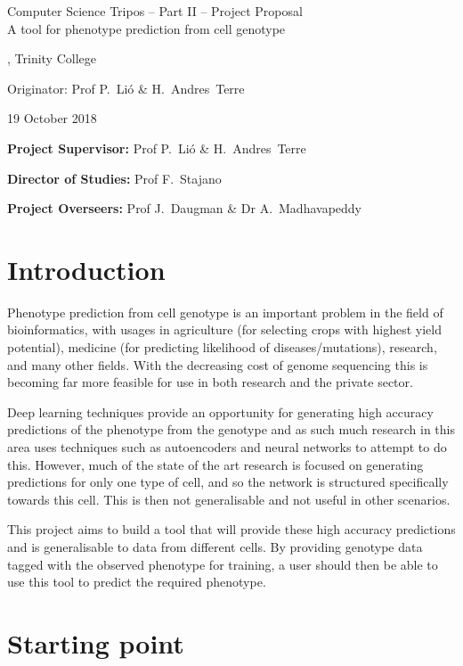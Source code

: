 \documentclass[12pt,a4paper,twoside,openany]{article}
\begin{document}
\begin{center}
\Large
Computer Science Tripos -- Part II -- Project Proposal\\[4mm]
\LARGE
A tool for phenotype prediction from cell genotype

\large
, Trinity College

Originator: Prof P.~Li\'o \& H.~Andres~Terre

19 October 2018
\end{center}

\vspace{5mm}

\textbf{Project Supervisor:} Prof P.~Li\'o \& H.~Andres~Terre

\textbf{Director of Studies:} Prof F.~Stajano

\textbf{Project Overseers:} Prof J.~Daugman  \& Dr A.~Madhavapeddy


\section*{Introduction}

Phenotype prediction from cell genotype is an important problem in the field of bioinformatics, with usages in agriculture (for selecting crops with highest yield potential), medicine (for predicting likelihood of diseases/mutations), research, and many other fields. With the decreasing cost of genome sequencing this is becoming far more feasible for use in both research and the private sector.

Deep learning techniques provide an opportunity for generating high accuracy predictions of the phenotype from the genotype and as such much research in this area uses techniques such as autoencoders and neural networks to attempt to do this. However, much of the state of the art research is focused on generating predictions for only one type of cell, and so the network is structured specifically towards this cell. This is then not generalisable and not useful in other scenarios.

This project aims to build a tool that will provide these high accuracy predictions and is generalisable to data from different cells. By providing genotype data tagged with the observed phenotype for training, a user should then be able to use this tool to predict the required phenotype.

\section*{Starting point}
\end{document}
